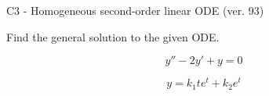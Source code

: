 \begin{exercise}
  \begin{exerciseTitle}C3 - Homogeneous second-order linear ODE (ver. 93)\end{exerciseTitle}
  \begin{exerciseStatement}
    
Find the general solution to the given ODE.

    
\[y''-2y'+y = 0\]

  \end{exerciseStatement}
  \begin{exerciseAnswer}
    
\[y= k_{1} t e^{t} + k_{2} e^{t}\]

  \end{exerciseAnswer}
\end{exercise}